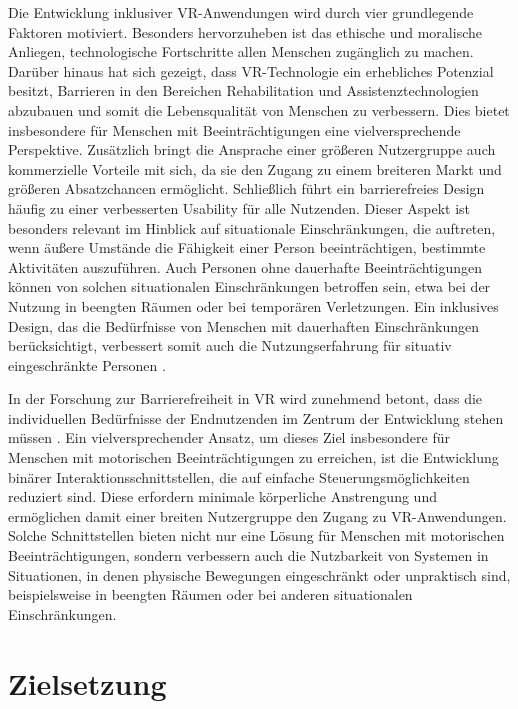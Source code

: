 Die Entwicklung inklusiver VR-Anwendungen wird durch vier grundlegende Faktoren motiviert. Besonders hervorzuheben ist das ethische und moralische Anliegen, technologische Fortschritte allen Menschen zugänglich zu machen. Darüber hinaus hat sich gezeigt, dass VR-Technologie ein erhebliches Potenzial besitzt, Barrieren in den Bereichen Rehabilitation und Assistenztechnologien abzubauen und somit die Lebensqualität von Menschen zu verbessern. Dies bietet insbesondere für Menschen mit Beeinträchtigungen eine vielversprechende Perspektive. Zusätzlich bringt die Ansprache einer größeren Nutzergruppe auch kommerzielle Vorteile mit sich, da sie den Zugang zu einem breiteren Markt und größeren Absatzchancen ermöglicht. Schließlich führt ein barrierefreies Design häufig zu einer verbesserten Usability für alle Nutzenden. Dieser Aspekt ist besonders relevant im Hinblick auf situationale Einschränkungen, die auftreten, wenn äußere Umstände die Fähigkeit einer Person beeinträchtigen, bestimmte Aktivitäten auszuführen. Auch Personen ohne dauerhafte Beeinträchtigungen können von solchen situationalen Einschränkungen betroffen sein, etwa bei der Nutzung in beengten Räumen oder bei temporären Verletzungen. Ein inklusives Design, das die Bedürfnisse von Menschen mit dauerhaften Einschränkungen berücksichtigt, verbessert somit auch die Nutzungserfahrung für situativ eingeschränkte Personen \citep{dudley_inclusive_2023}.

In der Forschung zur Barrierefreiheit in VR wird zunehmend betont, dass die individuellen Bedürfnisse der Endnutzenden im Zentrum der Entwicklung stehen müssen \citep{dombrowski_designing_2019}. Ein vielversprechender Ansatz, um dieses Ziel insbesondere für Menschen mit motorischen Beeinträchtigungen zu erreichen, ist die Entwicklung binärer Interaktionsschnittstellen, die auf einfache Steuerungsmöglichkeiten reduziert sind. Diese erfordern minimale körperliche Anstrengung und ermöglichen damit einer breiten Nutzergruppe den Zugang zu VR-Anwendungen. Solche Schnittstellen bieten nicht nur eine Lösung für Menschen mit motorischen Beeinträchtigungen, sondern verbessern auch die Nutzbarkeit von Systemen in Situationen, in denen physische Bewegungen eingeschränkt oder unpraktisch sind, beispielsweise in beengten Räumen oder bei anderen situationalen Einschränkungen.

\section{Zielsetzung}

